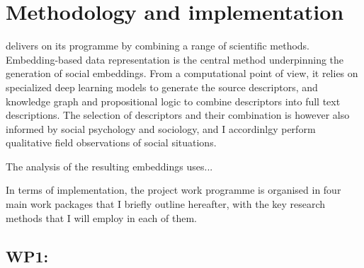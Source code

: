 
\section{Methodology and implementation}

\project delivers on its programme by combining a range of scientific methods.
Embedding-based data representation is the central method underpinning the
generation of social embeddings. From a computational point of view, it relies
on specialized deep learning models to generate the source descriptors, and
knowledge graph and propositional logic to combine descriptors into full text
descriptions. The selection of descriptors and their combination is however also
informed by social psychology and sociology, and I accordinlgy perform
qualitative field observations of social situations.


The analysis of the resulting embeddings uses... 


In terms of implementation, the \project project work programme is organised in
four main work packages that I briefly outline hereafter, with the key research
methods that I will employ in each of them.



\subsection{WP1: \textbf{\WPA}}

